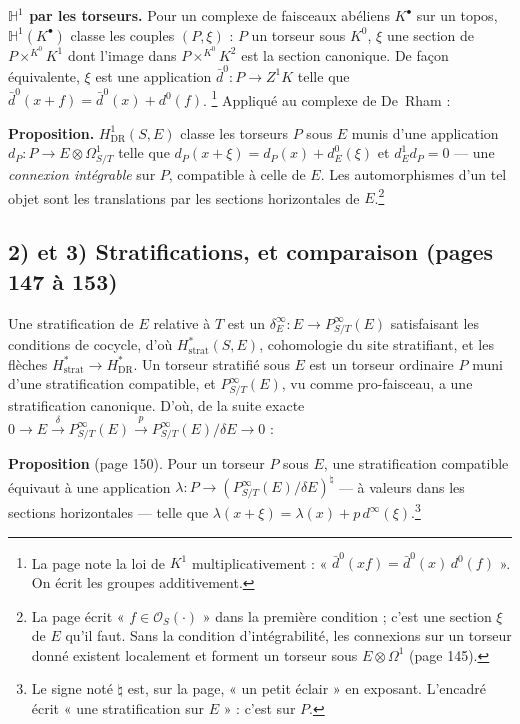 \documentclass[11pt,a4paper]{article}
\begin{document}
\textbf{$\mathbb{H}^1$ par les torseurs.} Pour un complexe de faisceaux
abéliens $K^\bullet$ sur un topos, $\mathbb{H}^1(K^\bullet)$ classe les couples
$(P, \xi)$ : $P$ un torseur sous $K^0$, $\xi$ une section de
$P \times^{K^0} K^1$ dont l'image dans $P \times^{K^0} K^2$ est la section
canonique. De façon équivalente, $\xi$ est une application
$\bar d^0 : P \to Z^1K$ telle que $\bar d^0(x + f) = \bar d^0(x) + d^0(f)$.
\footnote{La page note la loi de $K^1$ multiplicativement :
« $\bar d^0(xf) = \bar d^0(x)\,d^0(f)$ ». On écrit les groupes additivement.}
Appliqué au complexe de De~Rham :

\textbf{Proposition.} $H^1_{\mathrm{DR}}(S,E)$ classe les torseurs $P$ sous $E$
munis d'une application $d_P : P \to E \otimes \Omega^1_{S/T}$ telle que
$d_P(x + \xi) = d_P(x) + d^0_E(\xi)$ et $d^1_E d_P = 0$ — une \emph{connexion
intégrable} sur $P$, compatible à celle de $E$. Les automorphismes d'un tel
objet sont les translations par les sections horizontales de
$E$.\footnote{La page écrit « $f \in \mathcal{O}_S(\cdot)$ » dans la première
condition ; c'est une section $\xi$ de $E$ qu'il faut. Sans la condition
d'intégrabilité, les connexions sur un torseur donné existent localement et
forment un torseur sous $E \otimes \Omega^1$ (page 145).}

\subsection*{2) et 3) Stratifications, et comparaison (pages 147 à 153)}

Une stratification de $E$ relative à $T$ est un $\delta^\infty_E : E \to
P^\infty_{S/T}(E)$ satisfaisant les conditions de cocycle, d'où
$H^*_{\mathrm{strat}}(S,E)$, cohomologie du site stratifiant, et les flèches
$H^*_{\mathrm{strat}} \to H^*_{\mathrm{DR}}$. Un torseur stratifié sous $E$ est un
torseur ordinaire $P$ muni d'une stratification compatible, et
$P^\infty_{S/T}(E)$, vu comme pro-faisceau, a une stratification canonique.
D'où, de la suite exacte $0 \to E \xrightarrow{\delta} P^\infty_{S/T}(E)
\xrightarrow{p} P^\infty_{S/T}(E)/\delta E \to 0$ :

\textbf{Proposition} (page 150). Pour un torseur $P$ sous $E$, une
stratification compatible équivaut à une application
$\lambda : P \to (P^\infty_{S/T}(E)/\delta E)^{\natural}$ — à valeurs dans les
sections horizontales — telle que $\lambda(x + \xi) = \lambda(x) +
p\,d^\infty(\xi)$.\footnote{Le signe noté $\natural$ est, sur la page, « un petit
éclair » en exposant. L'encadré écrit « une stratification sur $E$ » : c'est
sur $P$.}
\end{document}
